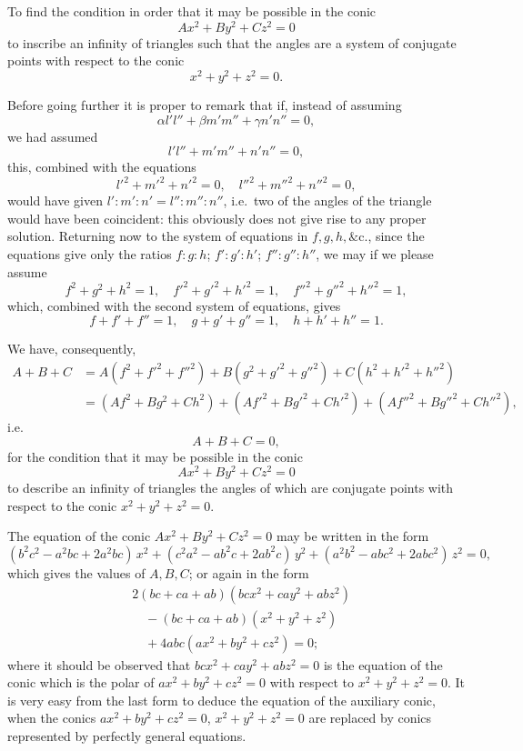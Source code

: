 \documentclass[12pt,a4paper]{article}
\theoremstyle{plain}
\begin{document}
To find the condition in order that it may be possible in the conic
\[
Ax^2+By^2+Cz^2=0
\]
to inscribe an infinity of triangles such that the angles are a system of conjugate points with respect to the conic
\[
x^2+y^2+z^2=0.
\]

Before going further it is proper to remark that if, instead of assuming
\[
\alpha l'l''+\beta m'm''+\gamma n'n''=0,
\]
we had assumed
\[
l'l''+m'm''+n'n''=0,
\]
this, combined with the equations
\[
l'^2+m'^2+n'^2=0,\quad l''^2+m''^2+n''^2=0,
\]
would have given $l':m':n'=l'':m'':n''$, i.e.\ two of the angles of the triangle would have been coincident: this obviously does not give rise to any proper solution. Returning now to the system of equations in $f,g,h,\&\mathrm{c}.$, since the equations give only the ratios $f:g:h$; $f':g':h'$; $f'':g'':h''$, we may if we please assume
\[
f^2+g^2+h^2=1,\quad f'^2+g'^2+h'^2=1,\quad f''^2+g''^2+h''^2=1,
\]
which, combined with the second system of equations, gives
\[
f+f'+f''=1,\quad g+g'+g''=1,\quad h+h'+h''=1.
\]

We have, consequently,
\begin{align*}
A+B+C &= A(f^2+f'^2+f''^2)+B(g^2+g'^2+g''^2)+C(h^2+h'^2+h''^2)\\
&= (Af^2+Bg^2+Ch^2)+(Af'^2+Bg'^2+Ch'^2)+(Af''^2+Bg''^2+Ch''^2),
\end{align*}
i.e.
\[
A+B+C=0,
\]
for the condition that it may be possible in the conic
\[
Ax^2+By^2+Cz^2=0
\]
to describe an infinity of triangles the angles of which are conjugate points with respect to the conic $x^2+y^2+z^2=0$.

\medskip

The equation of the conic $Ax^2+By^2+Cz^2=0$ may be written in the form
\[
(b^2c^2-a^2bc+2a^2bc)\,x^2+(c^2a^2-ab^2c+2ab^2c)\,y^2+(a^2b^2-abc^2+2abc^2)\,z^2=0,
\]
which gives the values of $A,B,C$; or again in the form
\begin{align*}
&2(bc+ca+ab)(bcx^2+cay^2+abz^2)\\
&\quad{}-(bc+ca+ab)(x^2+y^2+z^2)\\
&\quad{}+4abc(ax^2+by^2+cz^2)=0;
\end{align*}
where it should be observed that $bcx^2+cay^2+abz^2=0$ is the equation of the conic which is the polar of $ax^2+by^2+cz^2=0$ with respect to $x^2+y^2+z^2=0$. It is very easy from the last form to deduce the equation of the auxiliary conic, when the conics $ax^2+by^2+cz^2=0$, $x^2+y^2+z^2=0$ are replaced by conics represented by perfectly general equations.

\medskip
\end{document}
